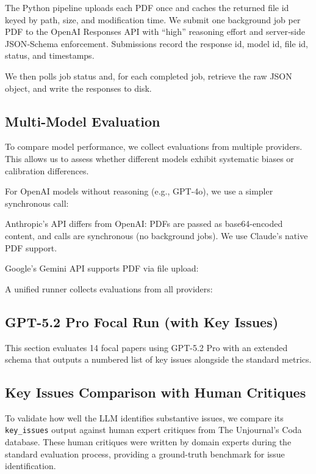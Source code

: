 \documentclass[
  11pt,
  letterpaper,
  DIV=11,
  numbers=noendperiod]{scrreprt}
\begin{document}
The Python pipeline uploads each PDF once and caches the returned file
id keyed by path, size, and modification time. We submit one background
job per PDF to the OpenAI Responses API with ``high'' reasoning effort
and server‑side JSON‑Schema enforcement. Submissions record the response
id, model id, file id, status, and timestamps.

We then polls job status and, for each completed job, retrieve the raw
JSON object, and write the responses to disk.

\subsection{Multi-Model Evaluation}\label{multi-model-evaluation}

To compare model performance, we collect evaluations from multiple
providers. This allows us to assess whether different models exhibit
systematic biases or calibration differences.

For OpenAI models without reasoning (e.g., GPT-4o), we use a simpler
synchronous call:

Anthropic's API differs from OpenAI: PDFs are passed as base64-encoded
content, and calls are synchronous (no background jobs). We use Claude's
native PDF support.

Google's Gemini API supports PDF via file upload:

A unified runner collects evaluations from all providers:

\subsection{GPT-5.2 Pro Focal Run (with Key
Issues)}\label{gpt-5.2-pro-focal-run-with-key-issues}

This section evaluates 14 focal papers using GPT-5.2 Pro with an
extended schema that outputs a numbered list of key issues alongside the
standard metrics.

\subsection{Key Issues Comparison with Human
Critiques}\label{key-issues-comparison-with-human-critiques}

To validate how well the LLM identifies substantive issues, we compare
its \texttt{key\_issues} output against human expert critiques from The
Unjournal's Coda database. These human critiques were written by domain
experts during the standard evaluation process, providing a ground-truth
benchmark for issue identification.
\end{document}
